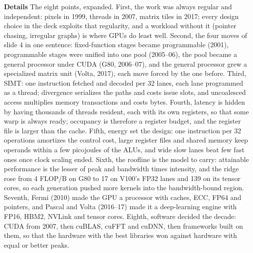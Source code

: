 \documentclass[11pt,letterpaper]{article}
\newcommand{\para}[1]{\medskip\noindent\textbf{#1}\quad}
\begin{document}
\para{Details} The eight points, expanded. First, the work was always regular and independent: pixels in 1999, threads in 2007, matrix tiles in 2017; every design choice in the deck exploits that regularity, and a workload without it (pointer chasing, irregular graphs) is where GPUs do least well. Second, the four moves of slide 4 in one sentence: fixed-function stages became programmable (2001), programmable stages were unified into one pool (2005--06), the pool became a general processor under CUDA (G80, 2006--07), and the general processor grew a specialized matrix unit (Volta, 2017), each move forced by the one before. Third, SIMT: one instruction fetched and decoded per 32 lanes, each lane programmed as a thread; divergence serializes the paths and costs issue slots, and uncoalesced access multiplies memory transactions and costs bytes. Fourth, latency is hidden by having thousands of threads resident, each with its own registers, so that some warp is always ready; occupancy is therefore a register budget, and the register file is larger than the cache. Fifth, energy set the design: one instruction per 32 operations amortizes the control cost, large register files and shared memory keep operands within a few picojoules of the ALUs, and wide slow lanes beat few fast ones once clock scaling ended. Sixth, the roofline is the model to carry: attainable performance is the lesser of peak and bandwidth times intensity, and the ridge rose from 4 FLOP/B on G80 to 17 on V100's FP32 lanes and 139 on its tensor cores, so each generation pushed more kernels into the bandwidth-bound region. Seventh, Fermi (2010) made the GPU a processor with caches, ECC, FP64 and pointers, and Pascal and Volta (2016--17) made it a deep-learning engine with FP16, HBM2, NVLink and tensor cores. Eighth, software decided the decade: CUDA from 2007, then cuBLAS, cuFFT and cuDNN, then frameworks built on them, so that the hardware with the best libraries won against hardware with equal or better peaks.
\end{document}
